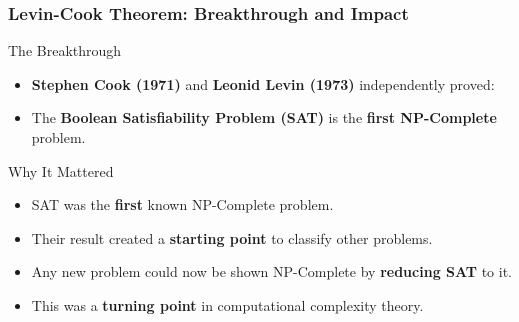 \begin{frame}
    \frametitle{Levin-Cook Theorem: Breakthrough and Impact}

    \begin{block}{The Breakthrough}
        \begin{itemize}
            \item \textbf{Stephen Cook (1971)} and \textbf{Leonid Levin (1973)} independently proved:
            \item The \textbf{Boolean Satisfiability Problem (SAT)} is the \textbf{first NP-Complete} problem.
        \end{itemize}
    \end{block}

    \vspace{0.5em}

    \begin{block}{Why It Mattered}
        \begin{itemize}
            \item SAT was the \textbf{first} known NP-Complete problem.
            \item Their result created a \textbf{starting point} to classify other problems.
            \item Any new problem could now be shown NP-Complete by \textbf{reducing SAT} to it.
            \item This was a \textbf{turning point} in computational complexity theory.
        \end{itemize}
    \end{block}
\end{frame}

